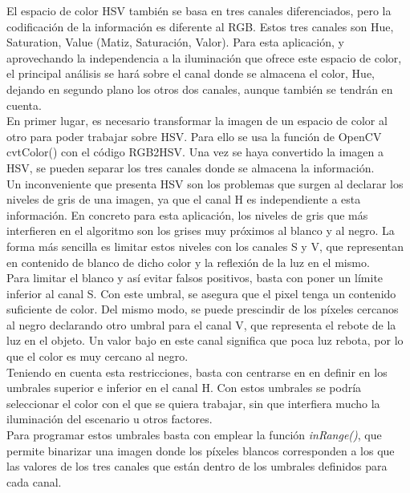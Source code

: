 El espacio de color HSV también se basa en tres canales diferenciados, pero la codificación de la información es diferente al RGB. Estos tres canales son Hue, Saturation, Value (Matiz, Saturación, Valor). Para esta aplicación, y aprovechando la independencia a la iluminación que ofrece este espacio de color, el principal análisis se hará sobre el canal donde se almacena el color, Hue, dejando en segundo plano los otros dos canales, aunque también se tendrán en cuenta.\\

En primer lugar, es necesario transformar la imagen de un espacio de color al otro para poder trabajar sobre HSV.  Para ello se usa la función de OpenCV cvtColor() con el código RGB2HSV. Una vez se haya convertido la imagen a HSV, se pueden separar los tres canales donde se almacena la información.\\

Un inconveniente que presenta HSV son los problemas que surgen al declarar los niveles de gris de una imagen, ya que el canal H es independiente a esta información. En concreto para esta aplicación, los niveles de gris que más interfieren en el algoritmo son los grises muy próximos al blanco y al negro. La forma más sencilla es limitar estos niveles con los canales S y V, que representan en contenido de blanco de dicho color y la reflexión de la luz en el mismo.\\

Para limitar el blanco y así evitar falsos positivos, basta con poner un límite inferior al canal S. Con este umbral, se asegura que el pixel tenga un contenido suficiente de color. Del mismo modo, se puede prescindir de los píxeles cercanos al negro declarando otro umbral para el canal V, que representa el rebote de la luz en el objeto. Un valor bajo en este canal significa que poca luz rebota, por lo que el color es muy cercano al negro.\\

Teniendo en cuenta esta restricciones, basta con centrarse en en definir en los umbrales superior e inferior en el canal H. Con estos umbrales se podría seleccionar el color con el que se quiera trabajar, sin que interfiera mucho la iluminación del escenario u otros factores.\\

Para programar estos umbrales basta con emplear la función \textit{inRange()}, que permite binarizar una imagen donde los píxeles blancos corresponden a los que las valores de los tres canales que están dentro de los umbrales definidos para cada canal.\\

